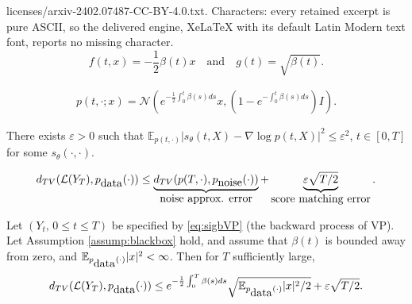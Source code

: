 \documentclass[10pt,a4paper]{amsart}
\begin{document}
licenses/arxiv-2402.07487-CC-BY-4.0.txt. Characters: every retained excerpt is pure ASCII, so the delivered engine, XeLaTeX with its default Latin Modern text font, reports no missing character.
\begin{equation}
\label{eq:sigbVP}
f(t,x) = -\frac{1}{2}\beta(t) x \quad \mbox{and} \quad g(t) = \sqrt{\beta(t)}.
\end{equation}

\begin{equation}
\label{eq:VPp}
\begin{aligned}
p(t, \cdot;x) = 
 \mathcal{N} \left( e^{-\frac{1}{2} \int_0^t \beta(s) ds} x, (1 - e^{-\int_0^t \beta(s) ds}) I  \right).
\end{aligned}
\end{equation}

\begin{assump}
\label{assump:blackbox}
There exists $\varepsilon > 0$ such that 
$\mathbb{E}_{p(t, \cdot)}|s_{\theta}(t,X) - \nabla \log p (t, X)|^2 \le \varepsilon^2$, $t \in [0,T]$ 
for some $s_\theta(\cdot, \cdot)$.
\end{assump}

\begin{equation}
\label{eq:mainTVbd}
d_{TV}(\mathcal{L}(Y_T), p_{\tiny \mbox{data}}(\cdot))
\le \underbrace{d_{TV}(p(T, \cdot), p_{\tiny \mbox{noise}}(\cdot))}_{\tiny \mbox{noise approx. error}}  + \underbrace{\varepsilon \sqrt{T/2}}_{\tiny \mbox{score matching error}}.
\end{equation}

\begin{corollary}
\label{coro:VPSDE}
Let $(Y_t, \, 0 \le t \le T)$ be specified by \eqref{eq:sigbVP} (the backward process of VP).
Let Assumption \ref{assump:blackbox} hold, 
and assume that $\beta(t)$ is bounded away from zero,
and $\mathbb{E}_{p_{\tiny \mbox{data}}(\cdot)} |x|^2 < \infty$.
Then for $T$ sufficiently large,
\begin{equation}
\label{eq:maincoroTV}
d_{TV}(\mathcal{L}(Y_T), p_{\tiny \mbox{data}}(\cdot)) \le 
e^{-\frac{1}{2}\int_0^T \beta(s) ds} \sqrt{\mathbb{E}_{p_{\tiny \mbox{data}}(\cdot)} |x|^2/2} + \varepsilon \sqrt{T/2}.
\end{equation}
\end{corollary}
\end{document}
